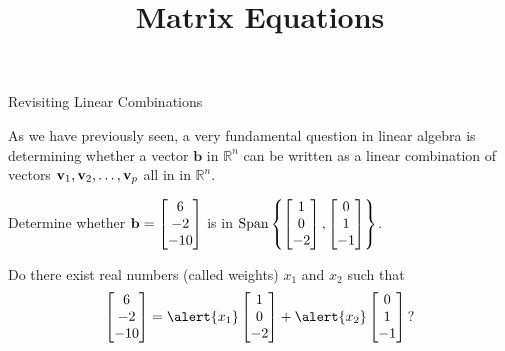 \documentclass[xcolor=dvipsnames,aspectratio=169,t]{beamer}
\title{Matrix Equations}
\begin{document}
\maketitle

\begin{frame}{Revisiting Linear Combinations}

  As we have previously seen, a very fundamental question in linear algebra is determining whether a vector $\mathbf{b}$ in $\mathbb{R}^n$ can be written as a linear combination of vectors $\mathbf{v}_1, \mathbf{v}_2, \ldots, \mathbf{v}_p$ all in in $\mathbb{R}^n$.

  \begin{example}
    Determine whether  $\displaystyle \mathbf{b} = \begin{bmatrix} 6 \\ -2 \\ -10 \end{bmatrix}$  is in $ \mbox{Span} \left\{ \begin{bmatrix} 1 \\ 0 \\ -2  \end{bmatrix},  \begin{bmatrix} 0 \\ 1 \\ -1  \end{bmatrix} \right\}$.
  \end{example}

    Do there exist real numbers (called \alert{weights}) \alert{$x_1$} and \alert{$x_2$} such that
    \[ \bbm 6 \\ -2 \\ -10 \ebm = \alert{x_1} \bbm 1 \\ 0 \\ -2  \ebm + \alert{x_2} \bbm 0 \\ 1 \\ -1  \ebm \mbox{?}\]

  
\end{frame}
\end{document}
